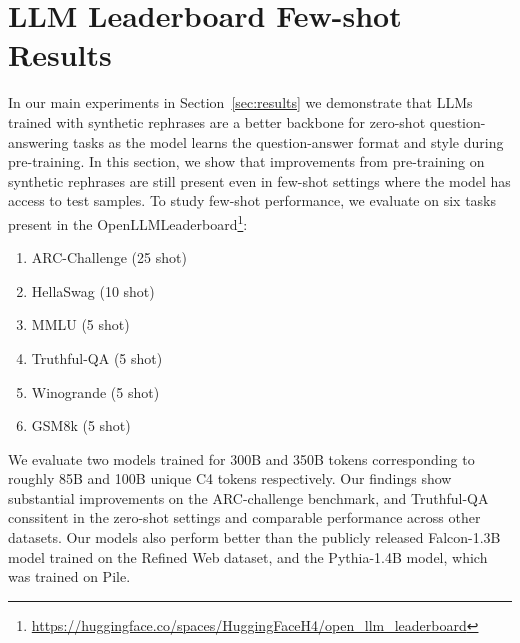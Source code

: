 \section{LLM Leaderboard Few-shot Results}
In our main experiments in Section~\ref{sec:results} we demonstrate that LLMs trained with synthetic rephrases are a better backbone for  zero-shot question-answering tasks as the model learns the question-answer format and style during pre-training.  In this section, we show that improvements from pre-training on synthetic rephrases are still present even in few-shot settings where the model has access to test samples.  To study few-shot performance, we evaluate on six tasks present in the OpenLLMLeaderboard\footnote{\url{https://huggingface.co/spaces/HuggingFaceH4/open\_llm\_leaderboard}}:

\begin{enumerate}
    \item ARC-Challenge (25 shot)
    \item HellaSwag (10 shot)
    \item MMLU (5 shot)
    \item Truthful-QA (5 shot)
    \item Winogrande (5 shot)
    \item GSM8k (5 shot)
\end{enumerate}

We evaluate two models trained for 300B and 350B tokens corresponding to roughly 85B and 100B unique C4 tokens respectively.  Our findings show substantial improvements on the ARC-challenge benchmark, and Truthful-QA conssitent in the zero-shot settings and comparable performance across other datasets.  Our models also perform better than the publicly released Falcon-1.3B model trained on the Refined Web dataset, and the Pythia-1.4B model, which was trained on Pile.  

\begin{table}
    \centering
    \caption{1.3B 300K LLM Leaderboard Eval. Evaluation is done on a single seed (1234).}
    \label{tab:llm_leaderboard}
\end{table}



